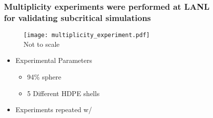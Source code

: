 \begin{comment}
\begin{frame}
\frametitle{Nuclear Data Definitions}
\begin{itemize}
	\vspace{-0.21in}
  \item Microscopic Cross sections $\sigma_i$ 
	\begin{itemize}
		\item \colb{total}: $\sigma_t = \sigma_f+\sigma_c+\sigma_s+\cdots$  	
		\item \colb{capture}: X$(n,\xcancel{n})$X'
	\end{itemize} 	
	
	\item The average number of neutrons produced per \colb{induced} fission $\boldsymbol{\overline{\nu}(E)}$
	\begin{itemize} 
  	\item $\displaystyle \nubar = \nubar_{prompt} + \nubar_{delayed}$
	\end{itemize} 

\end{itemize} 

\end{frame} 
\end{comment}


\begin{frame}
\frametitle{Multiplicity experiments were performed at LANL \\ for validating subcritical
simulations}
\begin{minipage}{0.4\linewidth}
    \hspace{-0.3in}
\begin{figure}[h]
\begin{center}
    \texttt{[image: multiplicity\_experiment.pdf]} \\
    {\fontsize{7pt}{6pt}\selectfont  *Not to scale}
\end{center}
\end{figure}
\end{minipage}
\begin{minipage}{0.54\linewidth}
    {\addtolength\leftmargini{-0.5in}
     \addtolength\leftmarginii{-0.2in}
     \addtolength\wideitemsep{0.1in}
\begin{itemize}
    \item[] Experimental Parameters
  \begin{itemize}
      \item 94\%  sphere \vspace{-0.2in}
      \item 5 Different HDPE shells \\ 
  \end{itemize}
  \item[] Experiments repeated w/ 
\end{itemize} 
}
\end{minipage}

\end{frame} 


